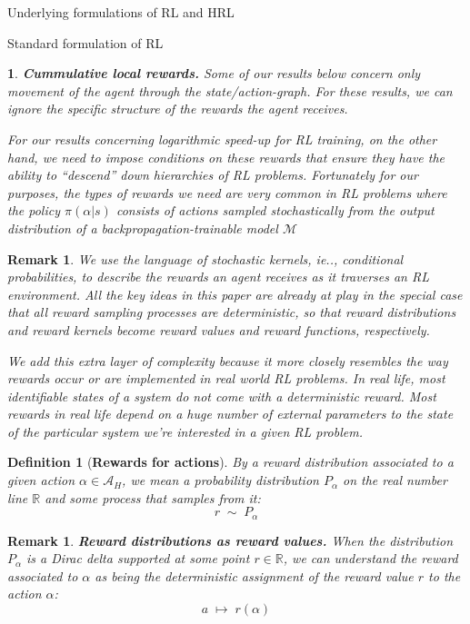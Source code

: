 \documentclass[11pt]{article}
\newtheorem{definition}[subsubsection]{Definition}
\newtheorem{remark}[subsubsection]{Remark}
\newtheorem{ermark}[subsubsection]{}
\begin{document}
\begin{section}{Underlying formulations of RL and HRL}
\begin{subsection}{Standard formulation of RL}
 \begin{ermark}
{\bf Cummulative local rewards.}
\normalfont
Some of our results below concern only movement of the agent through the state/action-graph. For these results, we can ignore the specific structure of the rewards the agent receives. 

For our results concerning logarithmic speed-up for RL training, on the other hand, we need to impose conditions on these rewards that ensure they have the ability to ``descend'' down hierarchies of RL problems. Fortunately for our purposes, the types of rewards we need are very common in RL problems where the policy $\pi(\alpha|s)$ consists of actions sampled stochastically from the output distribution of a backpropagation-trainable model $\mathcal{M}$
 \end{ermark}

\begin{remark}
{\bf }
\normalfont
We use the language of stochastic kernels, ie.., conditional probabilities, to describe the rewards an agent receives as it traverses an RL environment. All the key ideas in this paper are already at play in the special case that all reward sampling processes are deterministic, so that reward distributions and reward kernels become reward values and reward functions, respectively.

We add this extra layer of complexity because {\em it more closely resembles the way rewards occur or are implemented in real world RL problems}. In real life, most identifiable states of a system do not come with a deterministic reward. Most rewards in real life depend on a huge number of external parameters to the state of the particular system we're interested in a given RL problem.
\end{remark}
 
 \begin{definition}[{\bf Rewards for actions}]
 \normalfont
By a {\em reward distribution} associated to a given action $\alpha\in\mathcal{A}_{H}$, we mean a probability distribution $P_{\!\alpha}$ on the real number line $\mathbb{R}$ and some process that samples from it:
$$
r\;\sim\;P_{\!\alpha}
$$
\end{definition}

\begin{remark}
{\bf Reward distributions as reward values.}
\normalfont
When the distribution $P_{\!\alpha}$ is a Dirac delta supported at some point $r\in\mathbb{R}$, we can understand the {\em reward associated to} $\alpha$ as being the deterministic assignment of the reward value $r$ to the action $\alpha$:
$$
a\;\mapsto\;r(\alpha)
$$
\end{remark}


\end{subsection}
\end{section}
\end{document}
